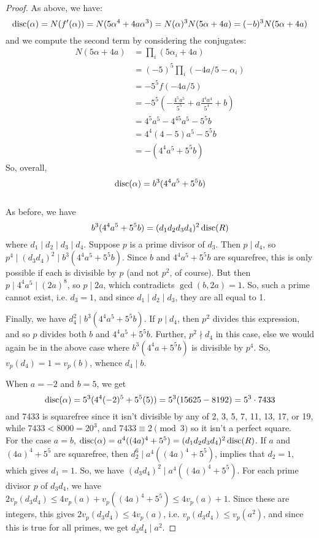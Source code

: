 \begin{proof} 
    As above, we have:
    \[ \operatorname{disc}(\alpha) = N(f'(\alpha)) = N(5\alpha^4+4a\alpha^3) = N(\alpha)^3N(5\alpha+4a) = (-b)^3N(5\alpha+4a) \]
    and we compute the second term by considering the conjugates:
    \begin{align*}
    N(5\alpha+4a)
        &= \prod_i (5\alpha_i+4a) \\
        &= (-5)^5\prod_i (-4a/5 - \alpha_i) \\
        &= -5^5f(-4a/5) \\
        &= -5^5\left(-\frac{4^5a^5}{5^5}+a\frac{4^4a^4}{5^4}+b\right) \\
        &= 4^5a^5 - 4^45a^5 - 5^5b \\
        &= 4^4(4-5)a^5 - 5^5b \\
        &= -(4^4a^5+5^5b)
    \end{align*}
    So, overall,
    \[ \operatorname{disc}(\alpha) = b^3(4^4a^5+5^5b) \] \\

    As before, we have
    \[ b^3(4^4a^5+5^5b) = (d_1d_2d_3d_4)^2\operatorname{disc}(R) \]
    where $d_1 \mid d_2 \mid d_3 \mid d_4$. Suppose $p$ is a prime divisor of $d_3$. Then $p \mid d_4$, so $p^4 \mid (d_3d_4)^2 \mid b^3(4^4a^5+5^5b)$. Since $b$ and $4^4a^5+5^5b$ are squarefree, this is only possible if each is divisible by $p$ (and not $p^2$, of course). But then $p \mid 4^4a^5 \mid (2a)^8$, so $p \mid 2a$, which contradicts $\gcd(b,2a) = 1$. So, such a prime cannot exist, i.e. $d_3 = 1$, and since $d_1 \mid d_2 \mid d_3$, they are all equal to 1.

    Finally, we have $d_4^2 \mid b^3(4^4a^5+5^5b)$. If $p \mid d_4$, then $p^2$ divides this expression, and so $p$ divides both $b$ and $4^4a^5+5^5b$. Further, $p^2 \nmid d_4$ in this case, else we would again be in the above case where $b^3(4^4a+5^5b)$ is divisible by $p^4$. So, $v_p(d_4) = 1 = v_p(b)$, whence $d_4 \mid b$.
    
    When $a=-2$ and $b=5$, we get
    \[ \operatorname{disc}(\alpha) = 5^3(4^4(-2)^5+5^5(5)) = 5^3(15625-8192) = 5^3 \cdot 7433 \]
    and 7433 is squarefree since it isn't divisible by any of 2, 3, 5, 7, 11, 13, 17, or 19, while $7433 < 8000 = 20^3$, and $7433 \equiv 2 \pmod{3}$ so it isn't a perfect square. \\

    For the case $a=b$, $\operatorname{disc}(\alpha) = a^4((4a)^4+5^5) = (d_1d_2d_3d_4)^2\operatorname{disc}(R)$. If $a$ and $(4a)^4+5^5$ are squarefree, then $d_2^6 \mid a^4((4a)^4+5^5)$, implies that $d_2 = 1$, which gives $d_1 = 1$. So, we have $(d_3d_4)^2 \mid a^4((4a)^4+5^5)$. For each prime divisor $p$ of $d_3d_4$, we have $2v_p(d_3d_4) \leq 4v_p(a)+v_p((4a)^4+5^5) \leq 4v_p(a)+1$. Since these are integers, this gives $2v_p(d_3d_4) \leq 4v_p(a)$, i.e. $v_p(d_3d_4) \leq v_p(a^2)$, and since this is true for all primes, we get $d_3d_4 \mid a^2$.


\end{proof}
